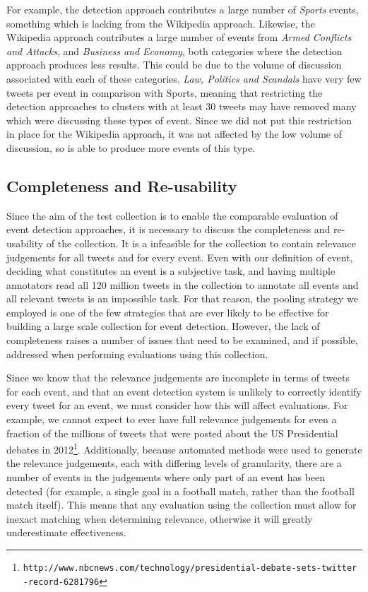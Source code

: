 For example, the detection approach contributes a large number of \emph{Sports} events, something which is lacking from the Wikipedia approach.
Likewise, the Wikipedia approach contributes a large number of events from \emph{Armed Conflicts and Attacks}, and \emph{Business and Economy}, both categories where the detection approach produces less results.
This could be due to the volume of discussion associated with each of these categories.
\emph{Law, Politics and Scandals} have very few tweets per event in comparison with Sports, meaning that restricting the detection approaches to clusters with at least 30 tweets may have removed many which were discussing these types of event.
Since we did not put this restriction in place for the Wikipedia approach, it was not affected by the low volume of discussion, so is able to produce more events of this type.

\subsection{Completeness and Re-usability}
Since the aim of the test collection is to enable the comparable evaluation of event detection approaches, it is necessary to discuss the completeness and re-usability of the collection.
It is a infeasible for the collection to contain relevance judgements for all tweets and for every event.
Even with our definition of event, deciding what constitutes an event is a subjective task, and having multiple annotators read all 120 million tweets in the collection to annotate all events and all relevant tweets is an impossible task.
For that reason, the pooling strategy we employed is one of the few strategies that are ever likely to be effective for building a large scale collection for event detection.
However, the lack of completeness raises a number of issues that need to be examined, and if possible, addressed when performing evaluations using this collection.

Since we know that the relevance judgements are incomplete in terms of tweets for each event, and that an event detection system is unlikely to correctly identify every tweet for an event, we must consider how this will affect evaluations.
For example, we cannot expect to ever have full relevance judgements for even a fraction of the millions of tweets that were posted about the US Presidential debates in 2012\footnote{\texttt{http://www.nbcnews.com/technology/presidential-debate-sets-twitter\\-record-6281796}}.
Additionally, because automated methods were used to generate the relevance judgements, each with differing levels of granularity, there are a number of events in the judgements where only part of an event has been detected (for example, a single goal in a football match, rather than the football match itself).
This means that any evaluation using the collection must allow for inexact matching when determining relevance, otherwise it will greatly underestimate effectiveness.

